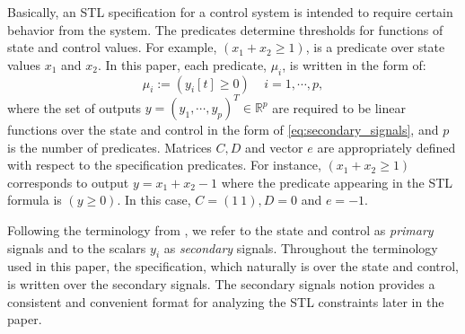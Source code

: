 \documentclass[letterpaper, 10 pt, conference]{ieeeconf}
\begin{document}
Basically, an STL specification for a control system is intended to require certain behavior from the system. The predicates determine thresholds for functions of state and control values. For example, $(x_1+x_2 \ge 1)$, is a  predicate over state values $x_1$ and $x_2$. 
In this paper, each predicate, $\mu_i$, is written in the form of:
\begin{equation}
\label{eq:predicates}
\mu_i:=\left(y_i[t] \geq 0 \right)~~~~~ i=1,\cdots,p,
\end{equation}
where the set of outputs $y=(y_1,\cdots, y_p)^T \in \mathbb{R}^p$ are required to be linear functions over the state and control in the form of \eqref{eq:secondary_signals}, and $p$ is the number of predicates. Matrices $C,D$ and vector $e$ are appropriately defined with respect to the specification predicates. 
For instance, $(x_1+x_2 \ge 1)$ corresponds to output $y=x_1+x_2-1$ where the predicate appearing in the STL formula is $(y\ge0)$. In this case, $C=(1~1), D=0$ and $e=-1$. 

Following the terminology from \cite{donze}, we refer to the state and control as \emph{primary} signals and to the scalars $y_i$ as  \emph{secondary} signals. Throughout the terminology used in this paper, the specification, which naturally is over the state and control, is written over the secondary signals. The secondary signals notion provides a consistent and convenient format for analyzing the STL constraints later in the paper. 
\end{document}
